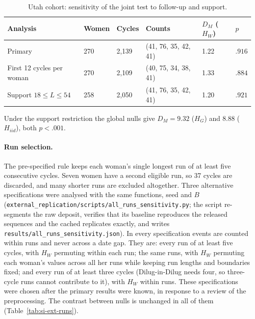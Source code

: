 \documentclass[12pt]{article}
\newcommand{\HG}{H_{G}}
\newcommand{\HI}{H_{iid}}
\newcommand{\HW}{H_{W}}
\newcommand{\DM}{D_{M}}
\begin{document}
\begin{table}[!htbp]
\centering
\caption{Utah cohort: sensitivity of the joint test to follow-up and support.}
\label{tab:si-ext-sens}
\smallskip
\small
\begin{tabular}{L{4.4cm} C{1.6cm} C{1.4cm} C{2.6cm} C{2.0cm} C{1.4cm}}
\toprule
\textbf{Analysis} & \textbf{Women} & \textbf{Cycles} & \textbf{Counts} & $\DM$ ($\HW$) & $p$ \\
\midrule
Primary                          & 270 & 2,139 & (41, 76, 35, 42, 41) & 1.22 & $.916$ \\
First 12 cycles per woman        & 270 & 2,109 & (40, 75, 34, 38, 41) & 1.33 & $.884$ \\
Support $18 \leq L \leq 54$      & 258 & 2,050 & (41, 76, 35, 42, 41) & 1.20 & $.921$ \\
\bottomrule
\end{tabular}
\smallskip

\footnotesize Under the support restriction the global nulls give $\DM = 9.32$ ($\HG$)
and $8.88$ ($\HI$), both $p < .001$.
\end{table}

\paragraph{Run selection.} The pre-specified rule keeps each woman's single longest run of
at least five consecutive cycles. Seven women have a second eligible run, so 37 cycles are
discarded, and many shorter runs are excluded altogether. Three alternative specifications
were analysed with the same functions, seed and $B$
(\nolinkurl{external_replication/scripts/all_runs_sensitivity.py}; the script re-segments
the raw deposit, verifies that its baseline reproduces the released sequences and the
cached replicates exactly, and writes \texttt{results/all\_runs\_sensitivity.json}). In every
specification events are counted within runs and never across a date gap. They are:
every run of at least five cycles, with $\HW$ permuting within each run; the same runs, with
$\HW$ permuting each woman's values across all her runs while keeping run lengths and
boundaries fixed; and every run of at least three cycles (Dilug-in-Dilug needs four, so
three-cycle runs cannot contribute to it), with $\HW$ within runs. These specifications
were chosen after the primary results were known, in response to a review of the
preprocessing. The contrast between nulls is unchanged in all of them
(Table~\ref{tab:si-ext-runs}).
\end{document}
